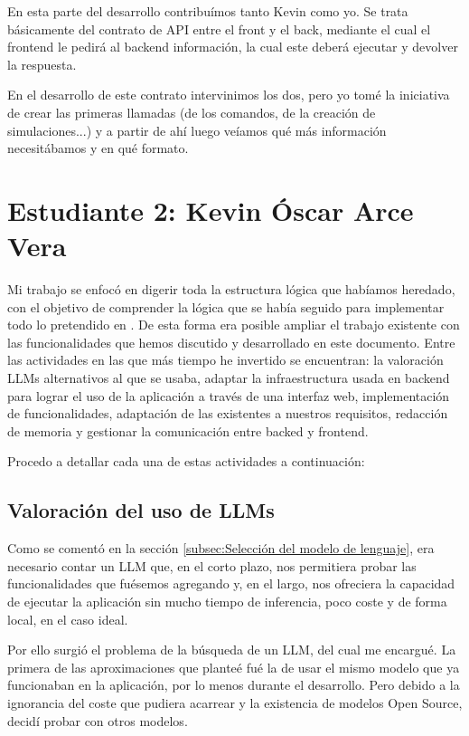 En esta parte del desarrollo contribuímos tanto Kevin como yo. Se trata básicamente del contrato de API entre el front y el back, mediante el cual el frontend le pedirá al backend información, la cual este deberá ejecutar y devolver la respuesta.

En el desarrollo de este contrato intervinimos los dos, pero yo tomé la iniciativa de crear las primeras llamadas (de los comandos, de la creación de simulaciones...) y a partir de ahí luego veíamos qué más información necesitábamos y en qué formato.

\section*{Estudiante 2: Kevin Óscar Arce Vera}

Mi trabajo se enfocó en digerir toda la estructura lógica que habíamos heredado, con el objetivo de comprender la lógica que se había seguido para implementar todo lo pretendido en \cite{park2023generative}. De esta forma era posible ampliar el trabajo existente con las funcionalidades que hemos discutido y desarrollado en este documento. Entre las actividades en las que más tiempo he invertido se encuentran: la valoración LLMs alternativos al que se usaba,  adaptar la infraestructura usada en backend para lograr el uso de la aplicación a través de una interfaz web, implementación de funcionalidades, adaptación de las existentes a nuestros requisitos, redacción de memoria y gestionar la comunicación entre backed y frontend.

Procedo a detallar cada una de estas actividades a continuación:

\subsection*{Valoración del uso de LLMs}

Como se comentó en la sección \ref{subsec:Selección del modelo de lenguaje}, era necesario contar un LLM que, en el corto plazo, nos permitiera probar las funcionalidades que fuésemos agregando y, en el largo, nos ofreciera la capacidad de ejecutar la aplicación sin mucho tiempo de inferencia, poco coste y de forma local, en el caso ideal.

Por ello surgió el problema de la búsqueda de un LLM, del cual me encargué. La primera de las aproximaciones que planteé fué la de usar el mismo modelo que ya funcionaban en la aplicación, por lo menos durante el desarrollo. Pero debido a la ignorancia del coste que pudiera acarrear y la existencia de modelos Open Source, decidí probar con otros modelos.

